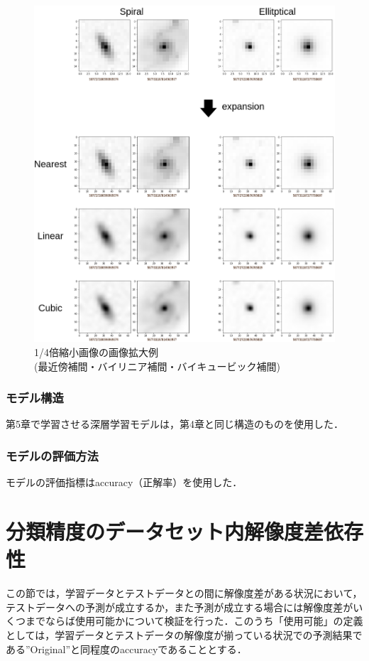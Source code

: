 \documentclass[a4j, 11pt]{jreport}
\begin{document}
\begin{figure}[H]
 \centering
 \includegraphics[width=13cm]{images/drawio/5syou_kakudai.png}
 \caption{1/4倍縮小画像の画像拡大例\\(最近傍補間・バイリニア補間・バイキュービック補間)}
 \label{fig:kakudai_1_4}
\end{figure}

\subsubsection{モデル構造}
第5章で学習させる深層学習モデルは，第4章と同じ構造のものを使用した．
 
\subsubsection{モデルの評価方法}
モデルの評価指標はaccuracy（正解率）を使用した．


\section{分類精度のデータセット内解像度差依存性}
この節では，学習データとテストデータとの間に解像度差がある状況において，テストデータへの予測が成立するか，また予測が成立する場合には解像度差がいくつまでならば使用可能かについて検証を行った．このうち「使用可能」の定義としては，学習データとテストデータの解像度が揃っている状況での予測結果である''Original''と同程度のaccuracyであることとする．
\end{document}
